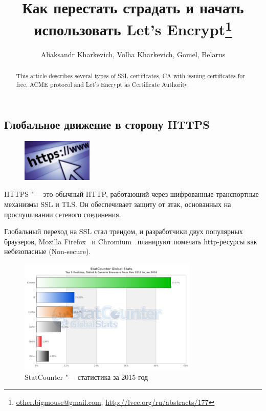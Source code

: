 \documentclass[10pt, a5paper]{article}
\begin{document}
\title{Как перестать страдать и начать использовать Let's Encrypt\footnote{\url{other.bigmouse@gmail.com}, \url{http://lvee.org/ru/abstracts/177}}}
\author{Aliaksandr Kharkevich, Volha Kharkevich, Gomel, Belarus}
\maketitle

\begin{abstract}
This article describes several types of SSL certificates, CA with issuing certificates for free, ACME protocol and Let's Encrypt as Certificate Authority.
\end{abstract}

\subsection*{Глобальное движение в сторону HTTPS}

\begin{figure}[h!]
  \centering
  \includegraphics[height=2cm]{w_03_2016_Kharkevich1.png}
  
\end{figure}

HTTPS "--- это обычный HTTP, работающий через шифрованные транспортные механизмы SSL и TLS. Он обеспечивает защиту от атак, основанных на прослушивании сетевого соединения.

Глобальный переход на SSL стал трендом, и разработчики двух популярных браузеров, Mozilla Firefox~\cite{Kharkevich1} и Chromium~\cite{Kharkevich2} планируют помечать http-ресурсы как небезопасные (Non-secure).

\begin{figure}[h!]
  \centering
  \includegraphics[height=5.5cm]{w_03_2016_Kharkevich2.png}
\caption*{StatCounter "--- статистика за 2015 год}
\end{figure}
\end{document}

